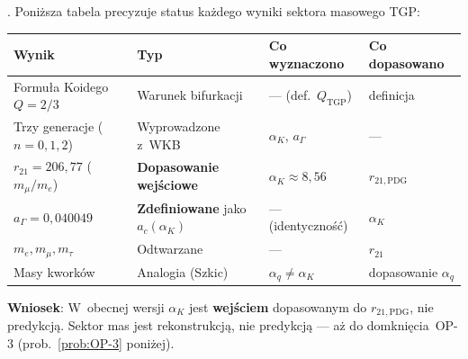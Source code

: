 \begin{remark}\label{rem:mass-hierarchy}
. Poni\.zsza tabela precyzuje status ka\.zdego wyniki
sektora masowego TGP:
\begin{center}\small
\begin{tabular}{@{}p{4.5cm}p{2.5cm}p{3.5cm}p{3.5cm}@{}}
\toprule
\textbf{Wynik} & \textbf{Typ} & \textbf{Co wyznaczono} & \textbf{Co dopasowano} \\
\midrule
Formu\l{}a Koidego $Q = 2/3$
  & Warunek bifurkacji
  & --- (def.\ $Q_{\mathrm{TGP}}$)
  & definicja \\[4pt]
Trzy generacje ($n=0,1,2$)
  & Wyprowadzone z~WKB
  & $\alpha_K$, $a_\Gamma$
  & --- \\[4pt]
$r_{21} = 206{,}77$ ($m_\mu/m_e$)
  & \textbf{Dopasowanie wej\'sciowe}
  & $\alpha_K \approx 8{,}56$
  & $r_{21,\mathrm{PDG}}$ \\[4pt]
$a_\Gamma = 0{,}040049$
  & \textbf{Zdefiniowane} jako $a_c(\alpha_K)$
  & --- (identyczno\'s\'c)
  & $\alpha_K$ \\[4pt]
$m_e, m_\mu, m_\tau$
  & Odtwarzane
  & ---
  & $r_{21}$ \\[4pt]
Masy kwork\'ow
  & Analogia (Szkic)
  & $\alpha_q \neq \alpha_K$
  & dopasowanie $\alpha_q$ \\[4pt]
\bottomrule
\end{tabular}
\end{center}
\medskip
\textbf{Wniosek}: W~obecnej wersji $\alpha_K$ jest \textbf{wej\'sciem} dopasowanym
do $r_{21,\mathrm{PDG}}$, nie predykcj\k{a}. Sektor mas jest rekonstrukcj\k{a},
nie predykcj\k{a} --- a\.z do domkni\k{e}cia~OP-3
(prob.~\ref{prob:OP-3} poni\.zej).
\end{remark}

